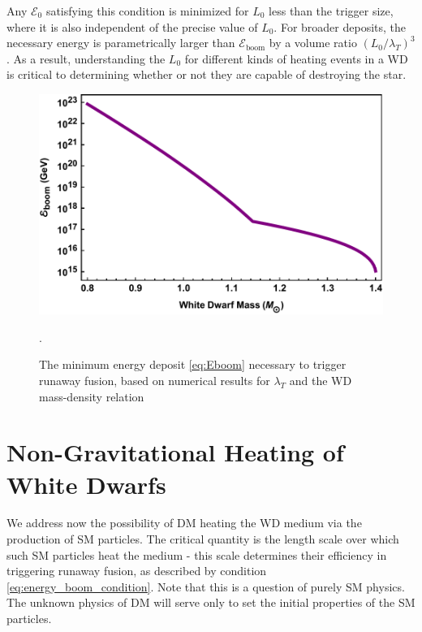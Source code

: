 \documentclass[twocolumn, preprintnumbers,amsmath,amssymb,prd, superscriptaddress]{revtex4}
\newcommand{\Ez}{\mathcal{E}_0}
\newcommand{\Eboom}{\mathcal{E}_\text{boom}}
\begin{document}
Any $\Ez$ satisfying this condition is minimized for $L_0$ less than the trigger size, where it is also independent of the precise value of $L_0$.
For broader deposits, the necessary energy is parametrically larger than $\Eboom$ by a volume ratio $(L_0/\lambda_T)^3$.
As a result, understanding the $L_0$ for different kinds of heating events in a WD is critical to determining whether or not they are capable of destroying the star.
\begin{figure}
\includegraphics[scale=.45]{Eboom.pdf}
\caption{The minimum energy deposit \eqref{eq:Eboom} necessary to trigger runaway fusion, based on numerical results for $\lambda_T$ \cite{Woosley} and the WD mass-density relation \cite{cococubed}}.
\label{fig:Eboom}
\end{figure}

\section{Non-Gravitational Heating of White Dwarfs}
\label{sec:SMHeating}

We address now the possibility of DM heating the WD medium via the production of SM particles.
The critical quantity is the length scale over which such SM particles heat the medium - this scale determines their efficiency in triggering runaway fusion, as described by condition \eqref{eq:energy_boom_condition}.
Note that this is a question of purely SM physics.
The unknown physics of DM will serve only to set the initial properties of the SM particles.
\end{document}
